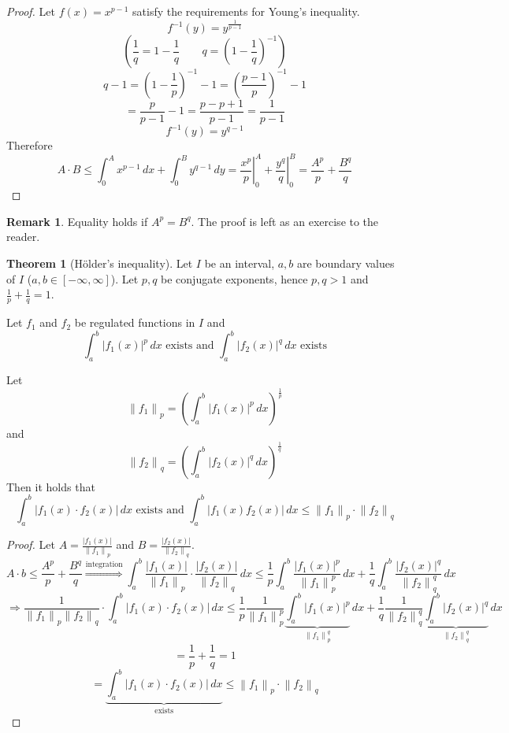 \documentclass[a4paper,landscape,twocolumn]{article}
\theoremstyle{definition}
\newtheorem{theorem}{Theorem}
\newtheorem{rem}{Remark}
\newcommand\abs[1]{\left|#1\right|}
\newcommand\norm[1]{\left\|#1\right\|}
\begin{document}
\begin{proof}
  Let $f(x) = x^{p-1}$ satisfy the requirements for Young's inequality.
  \[ f^{-1}(y) = y^{\frac{1}{p-1}} \]
  \[ \left( \frac1q = 1 - \frac1q \qquad q = \left(1 - \frac1q\right)^{-1}\right) \]
  \[ q - 1 = \left(1 - \frac1p\right)^{-1} - 1 = \left(\frac{p-1}{p}\right)^{-1} - 1 \]
  \[ = \frac{p}{p-1} - 1 = \frac{p - p + 1}{p - 1} = \frac{1}{p-1} \]
  \[ f^{-1}(y) = y^{q-1} \]
  Therefore
  \[
    A \cdot B \leq \int_0^A x^{p-1} \, dx + \int_0^B y^{q-1} \, dy
    = \left.\frac{x^p}{p}\right|_0^A + \left.\frac{y^q}{q}\right|_0^B
    = \frac{A^p}{p} + \frac{B^q}{q}
  \]
\end{proof}
\begin{rem}
  Equality holds if $A^p = B^q$. The proof is left as an exercise to the reader.
\end{rem}

\begin{theorem}[Hölder's inequality]
  Let $I$ be an interval, $a, b$ are boundary values of $I$ ($a,b \in [-\infty, \infty]$).
  Let $p,q$ be conjugate exponents, hence $p,q > 1$ and $\frac1p + \frac1q = 1$.

  Let $f_1$ and $f_2$ be regulated functions in $I$ and
  \[ \int_a^b \abs{f_1(x)}^p \, dx \text{ exists and } \int_a^b \abs{f_2(x)}^q \, dx \text{ exists} \]

  Let
  \[ \norm{f_1}_p = \left(\int_a^b \abs{f_1(x)}^p \, dx\right)^{\frac1p} \]
  and
  \[ \norm{f_2}_q = \left(\int_a^b \abs{f_2(x)}^q \, dx\right)^{\frac1q} \]
  Then it holds that
  \[
    \int_a^b \abs{f_1(x) \cdot f_2(x)} \, dx \text{ exists and }
    \int_a^b \abs{f_1(x) f_2(x)} \, dx
    \leq \norm{f_1}_p \cdot \norm{f_2}_q
  \]
\end{theorem}
\begin{proof}
  Let $A = \frac{\abs{f_1(x)}}{\norm{f_1}_p}$ and $B = \frac{\abs{f_2(x)}}{\norm{f_2}_q}$.
  \[
    A \cdot b \leq \frac{A^p}{p} + \frac{B^q}{q} \overset{\text{integration}}{\Rightarrow}
    \int_a^b \frac{\abs{f_1(x)}}{\norm{f_1}_p} \cdot \frac{\abs{f_2(x)}}{\norm{f_2}_q} \, dx
    \leq \frac1p \int_a^b \frac{\abs{f_1(x)}^p}{\norm{f_1}_p^p} \, dx
    + \frac1q \int_a^b \frac{\abs{f_2(x)}^q}{\norm{f_2}_q^q} \, dx
  \] \[
    \Rightarrow \frac{1}{\norm{f_1}_p \norm{f_2}_q} \cdot
    \int_a^b \abs{f_1(x) \cdot f_2(x)} \, dx
    \leq \frac{1}{p} \frac{1}{\norm{f_1}_p^p} \underbrace{\int_a^b \abs{f_1(x)}^p}_{\norm{f_1}_p^q} \, dx
    + \frac1q \frac1{\norm{f_2}_q^q} \underbrace{\int_a^b \abs{f_2(x)}^q}_{\norm{f_2}_q^q} \, dx
  \] \[
    = \frac1p + \frac1q = 1
  \] \[
    = \underbrace{\int_a^b \abs{f_1(x) \cdot f_2(x)} \, dx}_{\text{exists}}
    \leq \norm{f_1}_p \cdot \norm{f_2}_q
  \]
\end{proof}


\index[English]{}


\clearpage
\begin{otherlanguage}{ngerman}
\printindex[German]
\end{otherlanguage}
\printindex[English]
\end{document}
